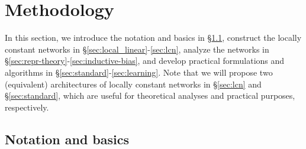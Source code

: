 \documentclass{article} \usepackage{iclr2020_conference,times}
\newcommand{\xref}[1]{\S\ref{#1}}
\begin{document}
%
 \vspace{-1mm}
\section{Methodology}
\vspace{-1mm}
In this section, we introduce the notation and basics in \xref{sec:notation}, construct the locally constant networks in \xref{sec:local_linear}-\ref{sec:lcn}, analyze the networks in \xref{sec:repr-theory}-\ref{sec:inductive-bias}, and develop practical formulations and algorithms in \xref{sec:standard}-\ref{sec:learning}. Note that we will propose two (equivalent) architectures of locally constant networks in \xref{sec:lcn} and \xref{sec:standard}, which are useful for theoretical analyses and practical purposes, respectively. 



\subsection{Notation and basics}\label{sec:notation}
\end{document}

